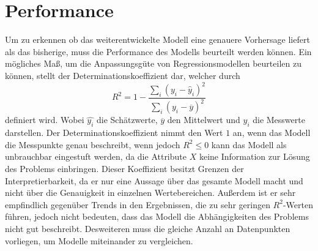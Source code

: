 \section{Performance}

Um zu erkennen ob das weiterentwickelte Modell eine genauere Vorhersage liefert als das bisherige, muss die
Performance des Modells beurteilt werden können.
Ein mögliches Maß, um die Anpassungsgüte von Regressionsmodellen beurteilen zu können, stellt der Determinationskoeffizient dar, welcher
durch
\begin{equation}
  R^2 = 1 - \frac{\sum_i (y_i-\hat{y}_i)^2}{\sum_i (y_i - \overline{y})^2}
\end{equation}
definiert wird. Wobei $\hat{y_i}$ die Schätzwerte, $\overline{y}$ den Mittelwert und $y_i$ die Messwerte darstellen.
Der Determinationskoeffizient nimmt den Wert $1$ an, wenn das Modell die Messpunkte genau beschreibt, wenn jedoch
$R^2 \leq 0$ kann das Modell als unbrauchbar eingestuft werden, da die Attribute $X$ keine Information zur
Lösung des Problems einbringen.
Dieser Koeffizient besitzt Grenzen der Interpretierbarkeit, da er nur eine Aussage über das gesamte Modell macht und
nicht über die Genauigkeit in einzelnen Wertebereichen. Außerdem ist er sehr empfindlich gegenüber Trends in den
Ergebnissen, die zu sehr geringen $R^2$-Werten führen, jedoch nicht bedeuten, dass das Modell die Abhängigkeiten des
Problems nicht gut beschreibt. Desweiteren muss die gleiche Anzahl an Datenpunkten vorliegen, um Modelle
miteinander zu vergleichen.

